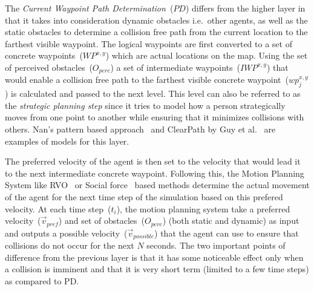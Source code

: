     The \emph{Current Waypoint Path Determination}~($PD$) differs from the higher layer in that it takes into consideration dynamic obstacles i.e.\ other agents, as well as the static obstacles to determine a collision free path from the current location to the farthest visible waypoint. The logical waypoints are first converted to a set of concrete waypoints~($WP^{x,y}$) which are actual locations on the map. Using the set of perceived obstacles~($O_{perc}$) a set of intermediate waypoints~($IWP^{x,y}$) that would enable a collision free path to the farthest visible concrete waypoint~($wp^{x,y}_j$) is calculated and passed to the next level. This level can also be referred to as the \emph{strategic planning step} since it tries to model how a person strategically moves from one point to another while ensuring that it minimizes collisions with others. Nan's pattern based approach~\cite{Nan:2011vr} and ClearPath by Guy et al.~\cite{Guy:2009gu} are examples of models for this layer.

    The preferred velocity of the agent is then set to the velocity that would lead it to the next intermediate concrete waypoint. Following this, the Motion Planning System like RVO~\cite{Guy:2010ko,Yeh:2008tg} or Social force~\cite{Helbing:1995ie} based methods determine the actual movement of the agent for the next time step of the simulation based on this prefered velocity. At each time step~($t_i$), the motion planning system take a preferred velocity~($\vec{v}_{pref}$) and set of obstacles~($O_{perc}$) (both static and dynamic) as input and outputs a possible velocity~($\vec{v}_{possible}$) that the agent can use to ensure that collisions do not occur for the next $N$ seconds. The two important points of difference from the previous layer is that it has some noticeable effect only when a collision is imminent and that it is very short term (limited to a few time steps) as compared to PD.


